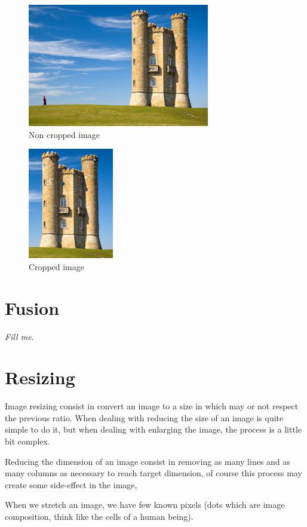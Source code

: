 \documentclass{article}
\begin{document}
	\begin{figure} [H]
		\centering
		\includegraphics[scale=1]{images/crop_1}
		\caption{Non cropped image \label{crop_1}}
	\end{figure}

	\begin{figure} [H]
		\centering
		\includegraphics[scale=1]{images/crop_2}
		\caption{Cropped image \label{crop_2}}
	\end{figure}

\section{Fusion}

	\textit{Fill me}.

\section{Resizing}

	Image resizing consist in convert an image to a size in which may or not respect the previous ratio.
	When dealing with reducing the size of an image is quite simple to do it, but when dealing with enlarging 
	the image, the process is a little bit complex.

	Reducing the dimension of an image consist in removing as many lines and as many columns as necessary to reach target dimension, of course this
	process may create some side-effect in the image, 

	When we stretch an image, we have few known pixels (dots which are image composition, think like the cells of a human being).
\end{document}
